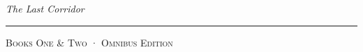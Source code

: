 \thispagestyle{empty}
\vspace*{8cm}
\begin{center}
{\Huge\itshape The Last Corridor}\par
\vspace{1.5em}
{\color{dim}\rule{6em}{0.4pt}}\par
\vspace{1em}
{\footnotesize\color{dim}\textsc{Books One \& Two \enspace · \enspace Omnibus Edition}}\par
\end{center}
\vfill
